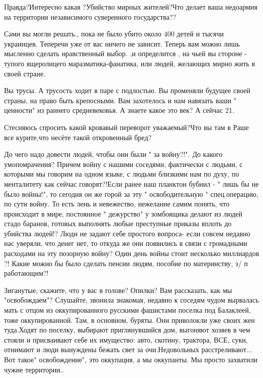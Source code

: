 Правда?Интересно какая ?Убийство мирных жителей?Что делает ваша недоармия на
территории независимого суверенного государства??

Сами вы могли решать., пока не было убито около 400 детей и тысячи украинцев.
Теперечи уже от вас ничего не зависит. Теперь вам можно лишь мысленно сделать
нравственный выбор. ,и определится , на чьей вы стороне - тупого ящеролицего
маразматика-фанатика, или людей, желающих мирно жить в своей стране.

Вы трусы. А трусость ходит в паре с подлостью. Вы променяли будущее своей
страны, на право быть крепосными. Вам захотелось и нам навязать ваши "
ценности" из раннего средневековья. А знаете какое это век? А сейчас 21.

Стесняюсь спросить какой кровавый переворот уважаемый?Что вы там в Раше все
курите,что несёте такой откровенный бред?

До чего надо довести людей, чтобы они были
" за войну?!".
До какого умопомрачения? Причем войну с нашими соседями, фактически с людьми, с которыми мы говорим на одном языке, с людьми близкими нам по духу, по менталитету как сейчас говорят?!Если ранее наш планктон бубнил -
" лишь бы не было войны!", то сегодня он же горой за эту
" освободительную " спец.операцию, по сути войну. То есть лень и невежество, нежелание самим понять, что происходит в мире, постоянное
" дежурство" у зомбоящика делают из людей стадо баранов, готовых выполнять любые преступные приказы вплоть до убийства людей!? Люди не задают себе простого вопроса- если совсем недавно нас уверяли, что денег нет, то откуда же они появились в связи с громадными расходами на эту позорную войну? Один день войны стоит несколько миллиардов ?! Какие можно бы было сделать пенсии людям, пособие по материнству, з/ п работающим?!

Зиганутые, скажите, что у вас в голове? Опилки? Вам рассказать, как мы
"освобождаем"? Слушайте, звонила знакомая, недавно к соседям чудом вырвалась
мать с отцом из оккупированного русскими фашистами поселка под Балаклеей, тоже
оккупированной. Там, в основном, буряты. Они приволокли уже своих жен
туда.Ходят по поселку, выбирают приглянувшийся дом, выгоняют хозяев в чем
стояли и присваивают себе их имущество: авто, скотину, трактора, ВСЕ, суки,
отнимают и люди вынуждены бежать свет за очи.Недовольных расстреливают... Вот
такое" освобождение", это оккупация, а мы оккупанты.  Мы просто захватили чужие
территории..

